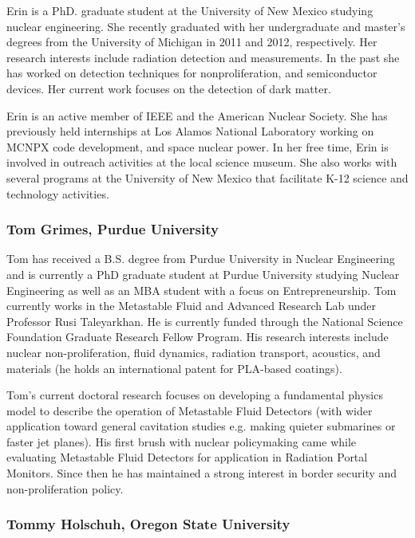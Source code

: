 Erin is a PhD. graduate student at the University of New Mexico studying nuclear
engineering. She recently graduated with her undergraduate and master's degrees
from the University of Michigan in 2011 and 2012, respectively. Her research
interests include radiation detection and measurements. In the past she has
worked on detection techniques for nonproliferation, and semiconductor
devices. Her current work focuses on the detection of dark matter.

Erin is an active member of IEEE and the American Nuclear Society. She has
previously held internships at Los Alamos National Laboratory working on MCNPX
code development, and space nuclear power. In her free time, Erin is involved in
outreach activities at the local science museum. She also works with several
programs at the University of New Mexico that facilitate K-12 science and
technology activities.

\subsubsection*{Tom Grimes, Purdue University}

Tom has received a B.S. degree from Purdue University in Nuclear Engineering and
is currently a PhD graduate student at Purdue University studying Nuclear
Engineering as well as an MBA student with a focus on Entrepreneurship. Tom
currently works in the Metastable Fluid and Advanced Research Lab under
Professor Rusi Taleyarkhan. He is currently funded through the National Science
Foundation Graduate Research Fellow Program. His research interests include
nuclear non-proliferation, fluid dynamics, radiation transport, acoustics, and
materials (he holds an international patent for PLA-based coatings).

Tom's current doctoral research focuses on developing a fundamental physics
model to describe the operation of Metastable Fluid Detectors (with wider
application toward general cavitation studies e.g. making quieter submarines or
faster jet planes). His first brush with nuclear policymaking came while
evaluating Metastable Fluid Detectors for application in Radiation Portal
Monitors. Since then he has maintained a strong interest in border security and
non-proliferation policy.

\subsubsection*{Tommy Holschuh, Oregon State University}

